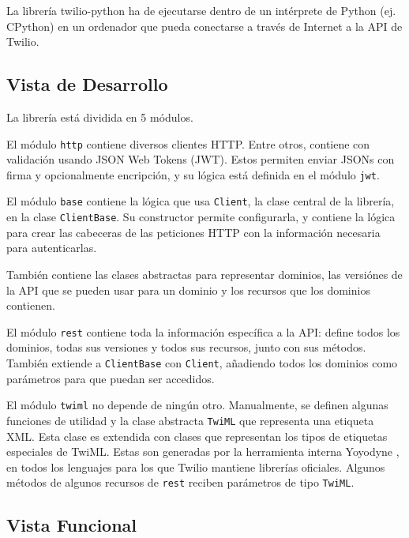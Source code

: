 \documentclass{article}
\begin{document}
\hfill

La librería twilio-python ha de ejecutarse
dentro de un intérprete de Python (ej. CPython)
en un ordenador que pueda conectarse a través de Internet
a la API de Twilio.

\subsection{Vista de Desarrollo}

La librería está dividida en 5 módulos.

\hfill

El módulo \verb|http| contiene diversos clientes HTTP.
Entre otros, contiene con validación usando JSON Web Tokens (JWT).
Estos permiten enviar JSONs con firma y opcionalmente encripción,
y su lógica está definida en el módulo \verb|jwt|.

\hfill

El módulo \verb|base| contiene
la lógica que usa \verb|Client|,
la clase central de la librería,
en la clase \verb|ClientBase|.
Su constructor permite configurarla,
y contiene la lógica para 
crear las cabeceras de las peticiones HTTP
con la información necesaria para autenticarlas.

También contiene las clases abstractas
para representar dominios,
las versiónes de la API que se pueden usar para un dominio
y los recursos que los dominios contienen.

\hfill

El módulo \verb|rest|
contiene toda la información específica a la API:
define todos los dominios,
todas sus versiones y todos sus recursos,
junto con sus métodos.
También extiende a \verb|ClientBase| con \verb|Client|,
añadiendo todos los dominios como parámetros
para que puedan ser accedidos.

\hfill

El módulo \verb|twiml| no depende de ningún otro.
Manualmente, se definen algunas funciones de utilidad
y la clase abstracta \verb|TwiML|
que representa una etiqueta XML.
Esta clase es extendida
con clases que representan los tipos de etiquetas especiales de TwiML.
Estas son generadas por la herramienta interna Yoyodyne
\cite{twilio-generated-yoyodyne},
en todos los lenguajes para los que Twilio mantiene librerías oficiales.
Algunos métodos de algunos recursos de \verb|rest|
reciben parámetros de tipo \verb|TwiML|.


\subsection{Vista Funcional}
\end{document}
